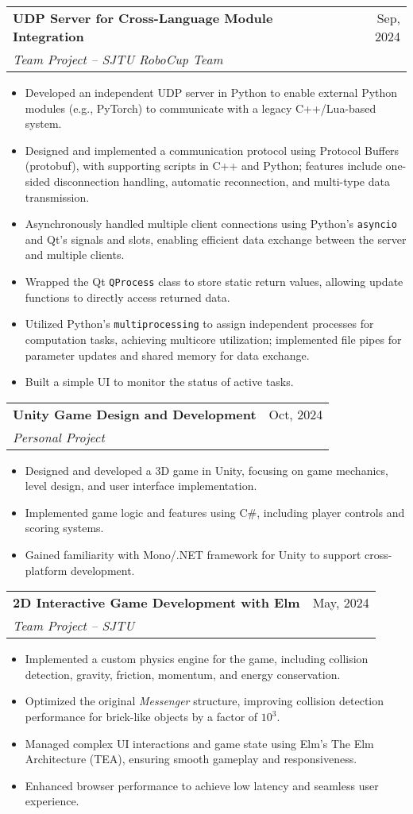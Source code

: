 \documentclass[letterpaper,11pt]{article}
\makeatletter
\newcommand{\resumeItem}[1]{\item\small{
  {#1 \vspace{-2pt}}
}}
\newcommand{\resumeSubheading}[4]{
  \vspace{-1pt}\item
  \begin{tabular*}{\textwidth}[t]{l@{\extracolsep{\fill}}r}
    \textbf{#1} & #2 \\
    \textit{\small#3} & \textit{\small #4} \\
  \end{tabular*}\vspace{-5pt}
}
\newcommand{\resumeItemListStart}{\begin{itemize}}
\newcommand{\resumeItemListEnd}{\end{itemize}}
\makeatother
\begin{document}
\resumeSubheading
{UDP Server for Cross-Language Module Integration}{Sep, 2024}
{Team Project – SJTU RoboCup Team}{}
\resumeItemListStart
\resumeItem{Developed an independent UDP server in Python to enable external Python modules (e.g., PyTorch) to communicate with a legacy C++/Lua-based system.}
\resumeItem{Designed and implemented a communication protocol using Protocol Buffers (protobuf), with supporting scripts in C++ and Python; features include one-sided disconnection handling, automatic reconnection, and multi-type data transmission.}
\resumeItem{Asynchronously handled multiple client connections using Python’s \texttt{asyncio} and Qt’s signals and slots, enabling efficient data exchange between the server and multiple clients.}
\resumeItem{Wrapped the Qt \texttt{QProcess} class to store static return values, allowing update functions to directly access returned data.}
\resumeItem{Utilized Python’s \texttt{multiprocessing} to assign independent processes for computation tasks, achieving multicore utilization; implemented file pipes for parameter updates and shared memory for data exchange.}
\resumeItem{Built a simple UI to monitor the status of active tasks.}
\resumeItemListEnd


\resumeSubheading
{Unity Game Design and Development}{Oct, 2024}
{Personal Project}{}
\resumeItemListStart
\resumeItem{Designed and developed a 3D game in Unity, focusing on game mechanics, level design, and user interface implementation.}
\resumeItem{Implemented game logic and features using C\#, including player controls and scoring systems.}
\resumeItem{Gained familiarity with Mono/.NET framework for Unity to support cross-platform development.}
\resumeItemListEnd



\resumeSubheading
{2D Interactive Game Development with Elm}{May, 2024}
{Team Project – SJTU}{}
\resumeItemListStart
\resumeItem{Implemented a custom physics engine for the game, including collision detection, gravity, friction, momentum, and energy conservation.}
\resumeItem{Optimized the original \textit{Messenger} structure, improving collision detection performance for brick-like objects by a factor of $10^{3}$.}
\resumeItem{Managed complex UI interactions and game state using Elm’s The Elm Architecture (TEA), ensuring smooth gameplay and responsiveness.}
\resumeItem{Enhanced browser performance to achieve low latency and seamless user experience.}
\resumeItemListEnd
\end{document}
